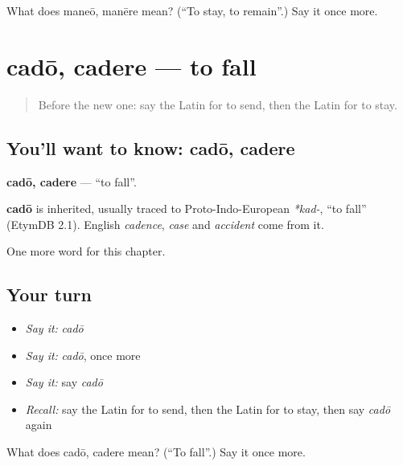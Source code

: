 \begin{tcolorbox}[breakable,colback=teal!4,colframe=teal!35!black,title={Before you move on}]
What does maneō, manēre mean? (\textquotedblleft{}To stay, to remain\textquotedblright{}.) Say it once more.
\end{tcolorbox}
\section[cadō, cadere]{cadō, cadere — to fall}

\label{lesson:LA-C77-cado}



\begin{quote}
Before the new one: say the Latin for to send, then the Latin for to stay.
\end{quote}

\subsection*{You'll want to know: cadō, cadere}
\textbf{cadō, cadere} — \textquotedblleft{}to fall\textquotedblright{}.

\begin{cousinweb}
\textbf{cadō} is inherited, usually traced to Proto-Indo-European \emph{*kad-}, \textquotedblleft{}to fall\textquotedblright{} (EtymDB 2.1). English \emph{cadence}, \emph{case} and \emph{accident} come from it.
\end{cousinweb}

\begin{grammarlens}[title={What you've built}]
One more word for this chapter.
\end{grammarlens}

\subsection*{Your turn}
\begin{itemize}
\raggedright
  \item \emph{Say it:} \emph{cadō}
  \item \emph{Say it:} \emph{cadō}, once more
  \item \emph{Say it:} say \emph{cadō}
  \item \emph{Recall:} say the Latin for to send, then the Latin for to stay, then say \emph{cadō} again
\end{itemize}

\begin{tcolorbox}[breakable,colback=teal!4,colframe=teal!35!black,title={Before you move on}]
What does cadō, cadere mean? (\textquotedblleft{}To fall\textquotedblright{}.) Say it once more.
\end{tcolorbox}

